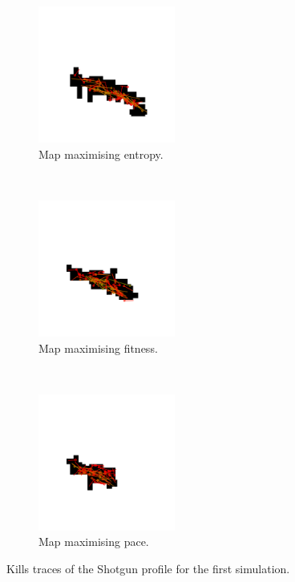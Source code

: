 \begin{figure}[H]
    \centering
    \begin{subfigure}[t]{0.3\textwidth}
        \centering
        \includegraphics[height=4.5cm]{Images/images/experiment_two/best_entropy_pop_0/kill_traces_bot_0.png}
        \caption{Map maximising entropy.}
    \end{subfigure}%
    ~ 
    \begin{subfigure}[t]{0.3\textwidth}
        \centering
        \includegraphics[height=4.5cm]{Images/images/experiment_two/best_fitness_pop_0/kill_traces_bot_0.png}
        \caption{Map maximising fitness.}
    \end{subfigure}
    ~ 
    \begin{subfigure}[t]{0.3\textwidth}
        \centering
        \includegraphics[height=4.5cm]{Images/images/experiment_two/best_pace_pop_0/kill_traces_bot_0.png}
        \caption{Map maximising pace.}
    \end{subfigure}
    \caption{Kills traces of the Shotgun profile for the first simulation.}
\end{figure}

\newpage

